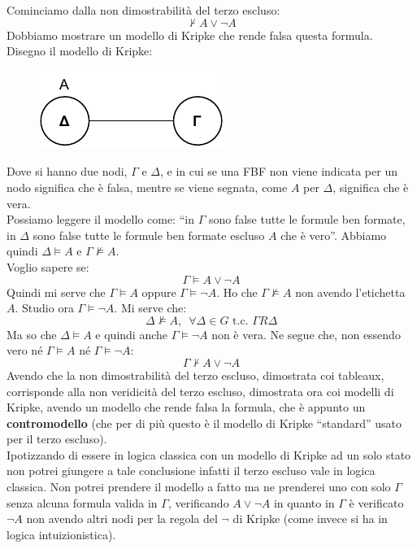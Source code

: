 \documentclass[a4paper,12pt, oneside]{book}
\begin{document}
\begin{esempio}
  Cominciamo dalla non dimostrabilità del terzo escluso:
  \[\nvdash A\lor \neg A\]
  Dobbiamo mostrare un modello di Kripke che rende falsa questa formula.\\
  Disegno il modello di Kripke:
  \begin{figure}[H]
    \centering
    \includegraphics[scale = 0.9]{img/k1.pdf}
  \end{figure}
  Dove si hanno due nodi, $\Gamma$ e $\Delta$, e in cui se una FBF non viene
  indicata per un nodo significa che è falsa, mentre se viene segnata, come $A$
  per $\Delta$, significa che è vera.\\
  Possiamo leggere il modello come: ``in $\Gamma$ sono false tutte le formule
  ben formate, in $\Delta$ sono false tutte le formule ben formate escluso $A$
  che è vero''. Abbiamo quindi $\Delta\vDash A$ e $\Gamma\nvDash A$.\\
  Voglio sapere se:
  \[\Gamma\vDash A\lor\neg A\]
  Quindi mi serve che $\Gamma\vDash A$ oppure $\Gamma\vDash \neg A$. Ho che
  $\Gamma\nvDash A$ non avendo l'etichetta $A$. Studio ora $\Gamma\vDash \neg
  A$. Mi serve che:
  \[\Delta\nvDash A,\,\,\,\forall \Delta\in G \mbox{ t.c. } \Gamma R\Delta\]
  Ma so che $\Delta\vDash A$ e quindi anche $\Gamma\vDash \neg A$ non è vera. Ne
  segue che, non essendo vero né $\Gamma\vDash A$ né $\Gamma\vDash \neg A$:
  \[\Gamma\nvdash A\lor \neg A\]
  Avendo che la non dimostrabilità del terzo escluso, dimostrata coi tableaux,
  corrisponde alla non veridicità del terzo escluso, dimostrata ora coi modelli
  di Kripke, avendo un modello che rende falsa la formula, che è appunto un
  \textbf{contromodello} (che per di più questo è il modello di Kripke
  ``standard'' usato per il terzo escluso). \\
  Ipotizzando di essere in logica classica con un modello di Kripke ad un solo
  stato non potrei giungere a tale conclusione infatti il terzo escluso vale in
  logica classica. Non potrei prendere il modello a fatto ma ne prenderei uno
  con solo $\Gamma$ senza alcuna formula valida in $\Gamma$, verificando $A\lor
  \neg A$ in quanto in $\Gamma$ è verificato $\neg A$ non avendo altri nodi per
  la regola del $\neg$ di Kripke (come invece si ha in logica intuizionistica).
\end{esempio}
\end{document}
